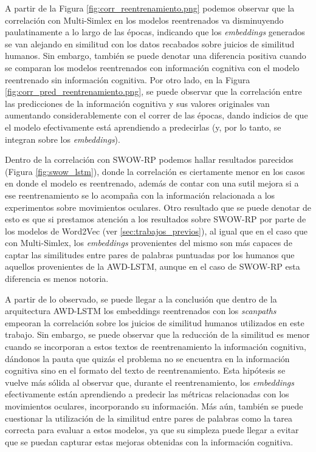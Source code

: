 A partir de la Figura \ref{fig:corr_reentrenamiento.png} podemos observar que la correlación con Multi-Simlex 
en los modelos reentrenados va disminuyendo paulatinamente a lo largo de 
las épocas, indicando que los \textit{embeddings} generados se van alejando en 
similitud con los datos recabados sobre juicios de similitud humanos. 
Sin embargo, también se puede denotar una diferencia positiva cuando se 
comparan los modelos reentrenados con información cognitiva con el modelo 
reentrenado sin información cognitiva. Por otro lado, en la Figura \ref{fig:corr_pred_reentrenamiento.png}, 
se puede observar que la correlación entre las predicciones de la 
información cognitiva y sus valores originales van aumentando 
considerablemente con el correr de las épocas, dando indicios de que 
el modelo efectivamente está aprendiendo a predecirlas (y, por lo tanto, 
se integran sobre los \textit{embeddings}).

Dentro de la correlación con SWOW-RP podemos hallar resultados parecidos 
(Figura \ref{fig:swow_lstm}), donde la correlación es ciertamente menor en los casos en donde 
el modelo es reentrenado, además de contar con una sutil mejora si a ese 
reentrenamiento se lo acompaña con la información relacionada a los experimentos 
sobre movimientos oculares.
Otro resultado que se puede denotar de esto es que si prestamos atención a 
los resultados sobre SWOW-RP por parte de los modelos de Word2Vec (ver  \ref{sec:trabajos_previos}), al igual que en el 
caso que con Multi-Simlex, los \textit{embeddings} provenientes del mismo son más 
capaces de captar las similitudes entre pares de palabras puntuadas por los 
humanos que aquellos provenientes de la AWD-LSTM, aunque en el caso de SWOW-RP 
esta diferencia es menos notoria.


A partir de lo observado, se puede llegar a la conclusión que dentro de la 
arquitectura AWD-LSTM los embeddings reentrenados con los \textit{scanpaths} 
empeoran la correlación sobre los juicios de similitud humanos utilizados 
en este trabajo. Sin embargo, se puede observar que la reducción de la similitud 
es menor cuando se incorporan a estos textos de reentrenamiento la información 
cognitiva, dándonos la pauta que quizás el problema no se encuentra en la 
información cognitiva sino en el formato del texto de reentrenamiento. 
Esta hipótesis se vuelve más sólida al observar que, durante el reentrenamiento, 
los \textit{embeddings} efectivamente están aprendiendo a predecir las métricas relacionadas 
con los movimientos oculares, incorporando su información.
Más aún, también se puede cuestionar la utilización de la similitud entre 
pares de palabras como la tarea correcta para evaluar a estos modelos, ya 
que su simpleza puede llegar a evitar que se puedan capturar estas 
mejoras obtenidas con la información cognitiva.





